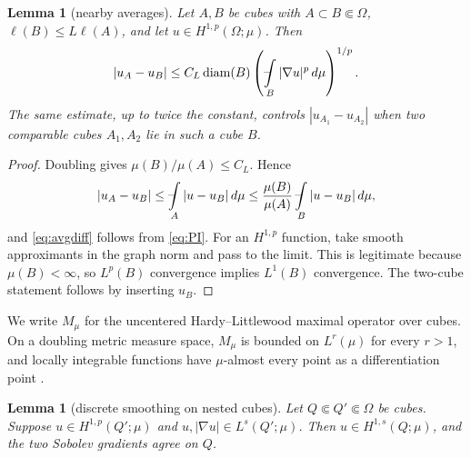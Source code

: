 \documentclass[11pt]{article}
\newtheorem{lemma}[theorem]{Lemma}
\newcommand{\avgint}{\mathop{\rlap{\raisebox{.12ex}{--}}\!\int}}
\newcommand{\diam}{\operatorname{diam}}
\begin{document}
\begin{lemma}[nearby averages]\label{lem:averages}
Let \(A,B\) be cubes with \(A\subset B\Subset\Omega\),
\(\ell(B)\le L\ell(A)\), and let \(u\in H^{1,p}(\Omega;\mu)\).  Then
\begin{equation}\label{eq:avgdiff}
 |u_A-u_B|
 \le C_L\diam(B)
       \left(\avgint_B|\nabla u|^p\,d\mu\right)^{1/p}.
\end{equation}
The same estimate, up to twice the constant, controls \(|u_{A_1}-u_{A_2}|\)
when two comparable cubes \(A_1,A_2\) lie in such a cube \(B\).
\end{lemma}

\begin{proof}
Doubling gives \(\mu(B)/\mu(A)\le C_L\).  Hence
\[
 |u_A-u_B|
 \le \avgint_A|u-u_B|\,d\mu
 \le \frac{\mu(B)}{\mu(A)}\avgint_B|u-u_B|\,d\mu,
\]
and \eqref{eq:avgdiff} follows from \eqref{eq:PI}.  For an
\(H^{1,p}\) function, take smooth approximants in the graph norm and pass to
the limit.  This is legitimate because \(\mu(B)<\infty\), so \(L^p(B)\)
convergence implies \(L^1(B)\) convergence.  The two-cube statement follows
by inserting \(u_B\).
\end{proof}

We write \(M_\mu\) for the uncentered Hardy--Littlewood maximal operator over
cubes.  On a doubling metric measure space, \(M_\mu\) is bounded on
\(L^r(\mu)\) for every \(r>1\), and locally integrable functions have
\(\mu\)-almost every point as a differentiation point \cite{Heinonen}.

\begin{lemma}[discrete smoothing on nested cubes]\label{lem:local}
Let \(Q\Subset Q'\Subset\Omega\) be cubes.  Suppose
\(u\in H^{1,p}(Q';\mu)\) and \(u,|\nabla u|\in L^s(Q';\mu)\).  Then
\(u\in H^{1,s}(Q;\mu)\), and the two Sobolev gradients agree on \(Q\).
\end{lemma}
\end{document}
